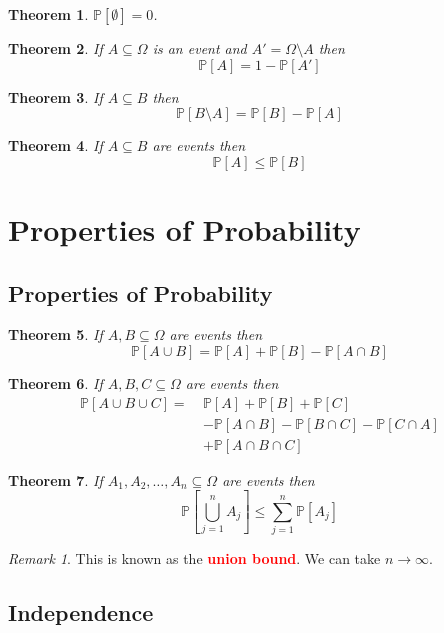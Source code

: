 \documentclass{article}
\newcommand{\PP}{\mathbb{P}}
\newcommand{\bfred}[1]{\textcolor{red}{\textbf{#1}}}
\theoremstyle{plain}
\newtheorem{thm}{Theorem}[section]
\theoremstyle{definition}
\theoremstyle{remark}
\newtheorem*{rem}{Remark}
\begin{document}
\begin{thm}
    $\PP[\emptyset] = 0$.
\end{thm}

\begin{thm}
    If $A \subseteq \Omega$ is an event and $A' = \Omega\setminus A$ then \[\PP[A] = 1 - \PP[A']\]
\end{thm}

\begin{thm}
    If $A \subseteq B$ then \[\PP[B\setminus A] = \PP[B] - \PP[A]\]
\end{thm}

\begin{thm}
    If $A \subseteq B$ are events then \[\PP[A] \leq \PP[B]\]
\end{thm}

\section{Properties of Probability}
\subsection{Properties of Probability}

\begin{thm}
    If $A, B \subseteq \Omega$ are events then \[\PP[A \cup B] = \PP[A] + \PP[B] - \PP[A \cap B]\]
\end{thm}

\begin{thm}
    If $A, B, C \subseteq \Omega$ are events then 
    \begin{align*}
        \PP[A \cup B \cup C] = \ &\PP[A] + \PP[B] + \PP[C] \\
        &-\PP[A \cap B] - \PP[B \cap C] - \PP[C \cap A] \\
        &+\PP[A \cap B \cap C]
    \end{align*}
\end{thm}

\begin{thm}
    If $A_1, A_2, \dotsc, A_n \subseteq \Omega$ are events then \[\PP\left[\bigcup_{j=1}^{n}A_j\right] \leq \sum_{j=1}^n\PP[A_j]\]
\end{thm}

\begin{rem}
    This is known as the \bfred{union bound}. We can take $n \rightarrow \infty$.
\end{rem}

\subsection{Independence}
\end{document}

